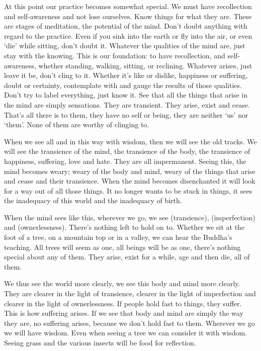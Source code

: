 At this point our practice becomes somewhat special. We must have recollection and self-awareness and not lose ourselves. Know things for what they are. These are stages of meditation, the potential of the mind. Don't doubt anything with regard to the practice. Even if you sink into the earth or fly into the air, or even `die' while sitting, don't doubt it. Whatever the qualities of the mind are, just stay with the knowing. This is our foundation: to have  recollection, and  self-awareness, whether standing, walking, sitting, or reclining. Whatever arises, just leave it be, don't cling to it. Whether it's like or dislike, happiness or suffering, doubt or certainty, contemplate with  and gauge the results of those qualities. Don't try to label everything, just know it. See that all the things that arise in the mind are simply sensations. They are transient. They arise, exist and cease. That's all there is to them, they have no self or being, they are neither `us' nor `them'. None of them are worthy of clinging to.

When we see all  and  in this way with wisdom, then we will see the old tracks. We will see the transience of the mind, the transience of the body, the transience of happiness, suffering, love and hate. They are all impermanent. Seeing this, the mind becomes weary; weary of the body and mind, weary of the things that arise and cease and their transience. When the mind becomes disenchanted it will look for a way out of all those things. It no longer wants to be stuck in things, it sees the inadequacy of this world and the inadequacy of birth. 

When the mind sees like this, wherever we go, we see  (transience),  (imperfection) and  (ownerlessness). There's nothing left to hold on to. Whether we sit at the foot of a tree, on a mountain top or in a valley, we can hear the Buddha's teaching. All trees will seem as one, all beings will be as one, there's nothing special about any of them. They arise, exist for a while, age and then die, all of them. 

We thus see the world more clearly, we see this body and mind more clearly. They are clearer in the light of transience, clearer in the light of imperfection and clearer in the light of ownerlessness. If people hold fast to things, they suffer. This is how suffering arises. If we see that body and mind are simply the way they are, no suffering arises, because we don't hold fast to them. Wherever we go we will have wisdom. Even when seeing a tree we can consider it with wisdom. Seeing grass and the various insects will be food for reflection. 

